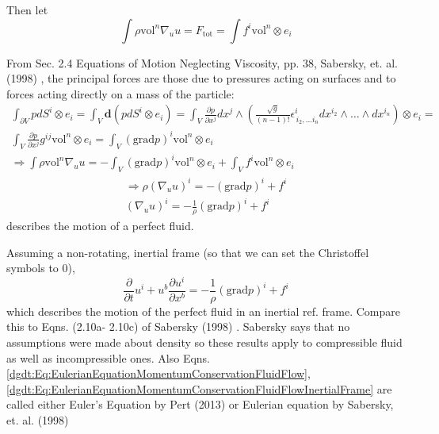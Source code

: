 Then let
\[
\int \rho \text{vol}^n \nabla_u u = F_{\text{tot}}  = \int f^i \text{vol}^n \otimes e_i
\]

From Sec. 2.4 Equations of Motion Neglecting Viscosity, pp. 38, Sabersky, et. al. (1998) \cite{dgdt:SAHG1998}, the principal forces are those due to pressures acting on surfaces and to forces acting directly on a mass of the particle:
\[
\begin{gathered}
\int_{\partial V} p dS^i \otimes e_i = \int_V \mathbf{d} (pdS^i \otimes e_i) = \int_V \frac{\partial p}{\partial x^j} dx^j \wedge \left( \frac{\sqrt{g}}{(n-1)!} \epsilon^i_{\, i_2, \dots i_n} dx^{i_2} \wedge \dots \wedge dx^{i_n} \right) \otimes e_i = \\
\int_V \frac{\partial p}{\partial x^j} g^{ij} \text{vol}^n \otimes e_i = \int_V (\text{grad}p)^i \text{vol}^n \otimes e_i \\
\Longrightarrow \int \rho \text{vol}^n \nabla_u u = -\int_V (\text{grad}p)^i \text{vol}^n \otimes e_i + \int_V f^i \text{vol}^n \otimes e_i
\end{gathered}
\]
\begin{equation}\label{dgdt:Eq:EulerianEquationMomentumConservationFluidFlow}
\begin{gathered}
\Longrightarrow \rho (\nabla_u u)^i = -(\text{grad}p)^i + f^i \\
(\nabla_u u)^i = -\frac{1}{\rho} (\text{grad}p)^i + f^i
\end{gathered}
\end{equation}
describes the motion of a perfect fluid.

Assuming a non-rotating, inertial frame (so that we can set the Christoffel symbols to 0),
\begin{equation}\label{dgdt:Eq:EulerianEquationMomentumConservationFluidFlowInertialFrame}
\frac{\partial}{\partial t} u^i + u^b \frac{\partial u^i}{\partial x^b} = - \frac{1}{\rho}(\text{grad}p)^i + f^i
\end{equation}
which describes the motion of the perfect fluid in an inertial ref. frame. Compare this to Eqns. (2.10a- 2.10c) of Sabersky (1998) \cite{dgdt:SAHG1998}. Sabersky says that no assumptions were made about density so these results apply to compressible fluid as well as incompressible ones. Also Eqns. \ref{dgdt:Eq:EulerianEquationMomentumConservationFluidFlow}, \ref{dgdt:Eq:EulerianEquationMomentumConservationFluidFlowInertialFrame} are called either Euler's Equation by Pert (2013) \cite{dgdt:Pert2013} or Eulerian equation by Sabersky, et. al. (1998) \cite{dgdt:SAHG1998}



